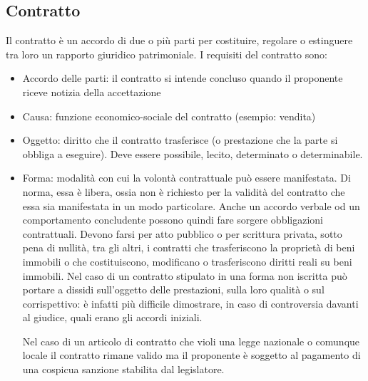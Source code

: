 \subsection{Contratto}
Il contratto è un accordo di due o più parti per costituire, regolare o estinguere tra loro un rapporto giuridico patrimoniale.\newline
I requisiti del contratto sono:
\begin{itemize}
    \item Accordo delle parti: il contratto si intende concluso quando il proponente riceve notizia della accettazione
    \item Causa: funzione economico-sociale del contratto (esempio: vendita)
    \item Oggetto: diritto che il contratto trasferisce (o prestazione che la parte si obbliga a eseguire). Deve essere possibile, lecito, determinato
        o determinabile.
    \item Forma: modalità con cui la volontà contrattuale può essere manifestata. Di norma, essa è libera, 
        ossia non è richiesto per la validità del contratto che essa sia manifestata in un modo particolare. Anche un accordo verbale od un comportamento 
        concludente possono quindi fare sorgere obbligazioni contrattuali.
        Devono farsi per atto pubblico o per scrittura privata, sotto pena di nullità, tra gli altri, i contratti che trasferiscono la proprietà di beni 
        immobili o che costituiscono, modificano o trasferiscono diritti reali su beni immobili.\newline
        Nel caso di un contratto stipulato in una forma non iscritta può portare a dissidi sull'oggetto delle prestazioni, sulla loro qualità o sul corrispettivo: è 
        infatti più difficile dimostrare, in caso di controversia davanti al giudice, quali erano gli accordi iniziali. \newline

        Nel caso di un articolo di contratto che violi una legge nazionale o comunque locale il contratto rimane valido ma il proponente è soggetto
        al pagamento di una cospicua sanzione stabilita dal legislatore.

\end{itemize}


